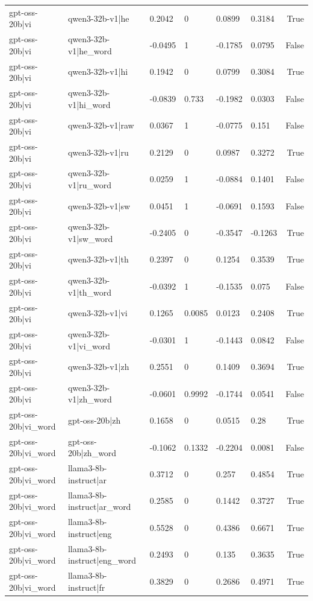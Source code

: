 \begin{table}
\begin{tabular}{llllllr}
gpt-oss-20b|vi & qwen3-32b-v1|he & 0.2042 & 0 & 0.0899 & 0.3184 & True \\
gpt-oss-20b|vi & qwen3-32b-v1|he_word & -0.0495 & 1 & -0.1785 & 0.0795 & False \\
gpt-oss-20b|vi & qwen3-32b-v1|hi & 0.1942 & 0 & 0.0799 & 0.3084 & True \\
gpt-oss-20b|vi & qwen3-32b-v1|hi_word & -0.0839 & 0.733 & -0.1982 & 0.0303 & False \\
gpt-oss-20b|vi & qwen3-32b-v1|raw & 0.0367 & 1 & -0.0775 & 0.151 & False \\
gpt-oss-20b|vi & qwen3-32b-v1|ru & 0.2129 & 0 & 0.0987 & 0.3272 & True \\
gpt-oss-20b|vi & qwen3-32b-v1|ru_word & 0.0259 & 1 & -0.0884 & 0.1401 & False \\
gpt-oss-20b|vi & qwen3-32b-v1|sw & 0.0451 & 1 & -0.0691 & 0.1593 & False \\
gpt-oss-20b|vi & qwen3-32b-v1|sw_word & -0.2405 & 0 & -0.3547 & -0.1263 & True \\
gpt-oss-20b|vi & qwen3-32b-v1|th & 0.2397 & 0 & 0.1254 & 0.3539 & True \\
gpt-oss-20b|vi & qwen3-32b-v1|th_word & -0.0392 & 1 & -0.1535 & 0.075 & False \\
gpt-oss-20b|vi & qwen3-32b-v1|vi & 0.1265 & 0.0085 & 0.0123 & 0.2408 & True \\
gpt-oss-20b|vi & qwen3-32b-v1|vi_word & -0.0301 & 1 & -0.1443 & 0.0842 & False \\
gpt-oss-20b|vi & qwen3-32b-v1|zh & 0.2551 & 0 & 0.1409 & 0.3694 & True \\
gpt-oss-20b|vi & qwen3-32b-v1|zh_word & -0.0601 & 0.9992 & -0.1744 & 0.0541 & False \\
gpt-oss-20b|vi_word & gpt-oss-20b|zh & 0.1658 & 0 & 0.0515 & 0.28 & True \\
gpt-oss-20b|vi_word & gpt-oss-20b|zh_word & -0.1062 & 0.1332 & -0.2204 & 0.0081 & False \\
gpt-oss-20b|vi_word & llama3-8b-instruct|ar & 0.3712 & 0 & 0.257 & 0.4854 & True \\
gpt-oss-20b|vi_word & llama3-8b-instruct|ar_word & 0.2585 & 0 & 0.1442 & 0.3727 & True \\
gpt-oss-20b|vi_word & llama3-8b-instruct|eng & 0.5528 & 0 & 0.4386 & 0.6671 & True \\
gpt-oss-20b|vi_word & llama3-8b-instruct|eng_word & 0.2493 & 0 & 0.135 & 0.3635 & True \\
gpt-oss-20b|vi_word & llama3-8b-instruct|fr & 0.3829 & 0 & 0.2686 & 0.4971 & True \\

\end{tabular}
\end{table}
